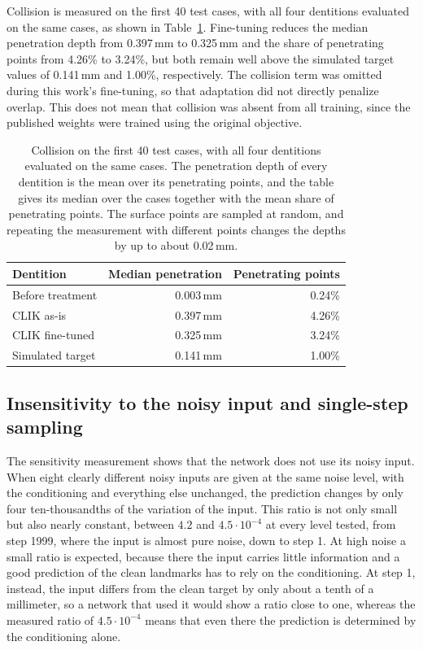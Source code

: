\documentclass[10pt,a4paper]{article}
\begin{document}
Collision is measured on the first 40 test cases, with all four dentitions evaluated on the same cases, as shown in Table~\ref{tab:collision}. Fine-tuning reduces the median penetration depth from 0.397\,mm to 0.325\,mm and the share of penetrating points from 4.26\% to 3.24\%, but both remain well above the simulated target values of 0.141\,mm and 1.00\%, respectively. The collision term was omitted during this work's fine-tuning, so that adaptation did not directly penalize overlap. This does not mean that collision was absent from all training, since the published weights were trained using the original objective.

\begin{table}[H]
\centering
\small
\begin{tabularx}{\textwidth}{@{}Xrr@{}}
\toprule
Dentition & Median penetration & Penetrating points \\
\midrule
Before treatment  & 0.003\,mm & 0.24\% \\
CLIK as-is        & 0.397\,mm & 4.26\% \\
CLIK fine-tuned   & 0.325\,mm & 3.24\% \\
Simulated target  & 0.141\,mm & 1.00\% \\
\bottomrule
\end{tabularx}
\caption{Collision on the first 40 test cases, with all four dentitions evaluated on the same cases. The penetration depth of every dentition is the mean over its penetrating points, and the table gives its median over the cases together with the mean share of penetrating points. The surface points are sampled at random, and repeating the measurement with different points changes the depths by up to about 0.02\,mm.}
\label{tab:collision}
\end{table}




\subsection{Insensitivity to the noisy input and single-step sampling}
\label{sec:invariance}

The sensitivity measurement shows that the network does not use its noisy input. When eight clearly different noisy inputs are given at the same noise level, with the conditioning and everything else unchanged, the prediction changes by only four ten-thousandths of the variation of the input. This ratio is not only small but also nearly constant, between $4.2$ and $4.5\cdot10^{-4}$ at every level tested, from step 1999, where the input is almost pure noise, down to step 1. At high noise a small ratio is expected, because there the input carries little information and a good prediction of the clean landmarks has to rely on the conditioning. At step 1, instead, the input differs from the clean target by only about a tenth of a millimeter, so a network that used it would show a ratio close to one, whereas the measured ratio of $4.5\cdot10^{-4}$ means that even there the prediction is determined by the conditioning alone.
\end{document}
